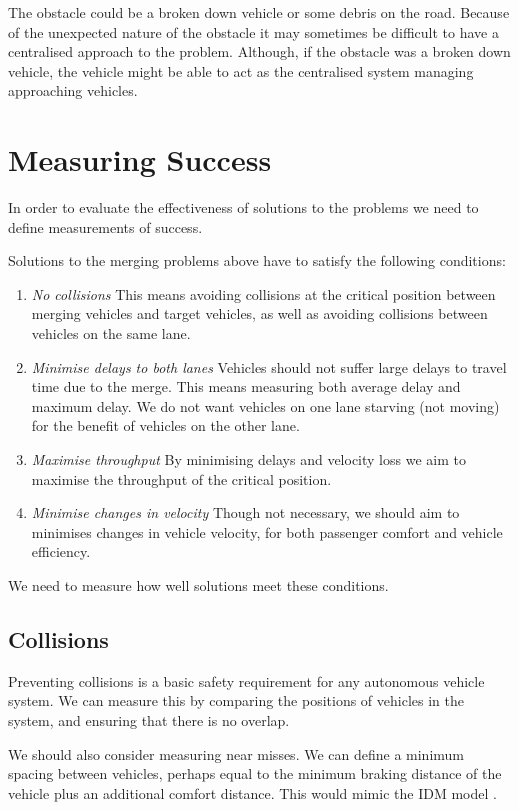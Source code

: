 The obstacle could be a broken down vehicle or some debris on the road. Because of the unexpected nature of the obstacle it may sometimes be difficult to have a centralised approach to the problem. Although, if the obstacle was a broken down vehicle, the vehicle might be able to act as the centralised system managing approaching vehicles. 

\section{Measuring Success}
\label{sec:Measuring Success}
In order to evaluate the effectiveness of solutions to the problems we need to define measurements of success. 

Solutions to the merging problems above have to satisfy the following conditions:

\begin{enumerate}
\item \textit{No collisions}
This means avoiding collisions at the critical position between merging vehicles and target vehicles, as well as avoiding collisions between vehicles on the same lane.
\item \textit{Minimise delays to both lanes}
Vehicles should not suffer large delays to travel time due to the merge. This means measuring both average delay and maximum delay. We do not want vehicles on one lane starving (not moving) for the benefit of vehicles on the other lane.
\item \textit{Maximise throughput}
By minimising delays and velocity loss we aim to maximise the throughput of the critical position.
\item \textit{Minimise changes in velocity}
Though not necessary, we should aim to minimises changes in vehicle velocity, for both passenger comfort and vehicle efficiency.
\end{enumerate}

We need to measure how well solutions meet these conditions. 

\subsection{Collisions}
\label{subsec:Collisions}
Preventing collisions is a basic safety requirement for any autonomous vehicle system. We can measure this by comparing the positions of vehicles in the system, and ensuring that there is no overlap.

We should also consider measuring near misses. We can define a minimum spacing between vehicles, perhaps equal to the minimum braking distance of the vehicle plus an additional comfort distance. This would mimic the IDM model \citep{Treiber2000}.

